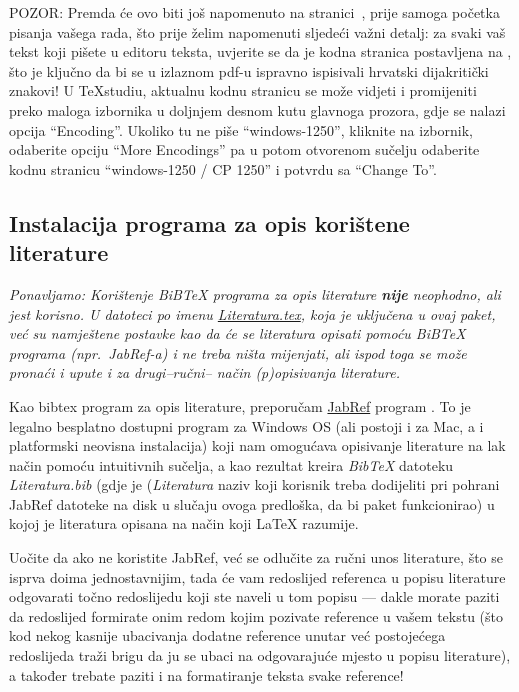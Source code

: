 \label{encoding1} {\color{red} POZOR: Premda će ovo biti još napomenuto na stranici~\pageref{encoding2}, prije samoga početka pisanja vašega rada, što prije želim napomenuti sljedeći važni detalj: za svaki vaš tekst koji pišete u editoru teksta, uvjerite se da je kodna stranica postavljena na , što je ključno da bi se u izlaznom pdf-u ispravno ispisivali hrvatski dijakritički znakovi! U TeXstudiu, aktualnu kodnu stranicu se može vidjeti i promijeniti preko maloga izbornika u doljnjem desnom kutu glavnoga prozora, gdje se nalazi opcija ``Encoding''. Ukoliko tu ne piše ``windows-1250'', kliknite na izbornik, odaberite opciju ``More Encodings'' pa u potom otvorenom sučelju odaberite kodnu stranicu ``windows-1250 / CP 1250'' i potvrdu sa ``Change To''.}

\subsection{Instalacija programa za opis korištene literature}
\emph{Ponavljamo: Korištenje BiBTeX programa za opis literature \textbf{nije} neophodno, ali jest korisno. U datoteci po imenu \href{run:Literatura.tex}{{\color{blue}Literatura.tex}}, koja je uključena u ovaj paket, već su namještene postavke kao da će se literatura opisati pomoću BiBTeX programa (npr.\ JabRef-a) i ne treba ništa mijenjati, ali ispod toga se može pronaći i upute i za drugi--ručni-- način (p)opisivanja literature.}

Kao bibtex program za opis literature, preporučam \href{http://www.jabref.org}{{\color{blue} JabRef}} program \cite{jabref}. To je legalno besplatno dostupni program za Windows OS (ali postoji i za Mac, a i platformski neovisna instalacija) koji nam omogućava opisivanje literature na lak način pomoću intuitivnih sučelja, a kao rezultat kreira \emph{BibTeX} datoteku \emph{Literatura.bib} (gdje je (\emph{Literatura} naziv koji korisnik treba dodijeliti pri pohrani JabRef datoteke na disk u slučaju ovoga predloška, da bi paket funkcionirao) u kojoj je literatura opisana na način koji \LaTeX{} razumije. 

Uočite da ako ne koristite JabRef, već se odlučite za ručni unos literature, što se isprva doima jednostavnijim, tada će vam redoslijed referenca u popisu literature odgovarati točno redoslijedu koji ste naveli u tom popisu --- dakle morate paziti da redoslijed formirate onim redom kojim pozivate reference u vašem tekstu (što kod nekog kasnije ubacivanja dodatne reference unutar već postojećega redoslijeda traži brigu da ju se ubaci na odgovarajuće mjesto u popisu literature), a također trebate paziti i na formatiranje teksta svake reference! 

